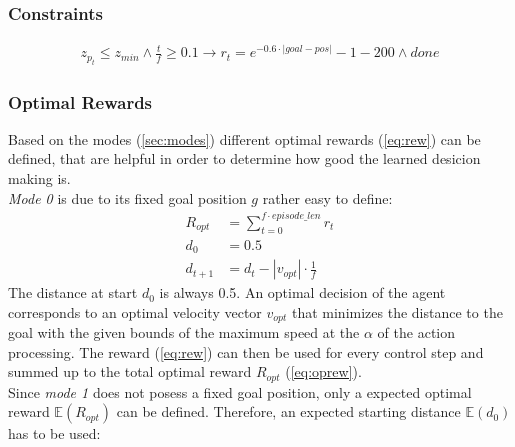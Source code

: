 \subsubsection{Constraints}
\begin{align}
	z_{p_t} \leq z_{min} \land \frac{t}{f} \geq 0.1 \to r_t = e^{-0.6 \cdot |goal - pos|} - 1 -200 \land done
\end{align}

\newpage

\subsubsection{Optimal Rewards}
Based on the modes (\cref{sec:modes}) different optimal rewards (\cref{eq:rew}) can be defined, that are helpful in order to determine how good the learned desicion making is.\\
\newline
\emph{Mode 0} is due to its fixed goal position $g$ rather easy to define:
\begin{align}
R_{opt} &= \sum_{t=0}^{f \cdot episode\_len} r_t \label{eq:oprew}\\
d_0 &= 0.5\\
d_{t+1} &= d_t - |v_{opt}| \cdot \frac{1}{f} \label{eq:dt1}%
\end{align}
The distance at start $d_0$ is always 0.5. An optimal decision of the agent corresponds to an optimal velocity vector $v_{opt}$ that minimizes the distance to the goal with the given bounds of the maximum speed at the $\alpha$ of the action processing. The reward (\cref{eq:rew}) can then be used for every control step and summed up to the total optimal reward $R_{opt}$ (\cref{eq:oprew}).\\
\newline
Since \emph{mode 1} does not posess a fixed goal position, only a expected optimal reward $\mathbb{E}(R_{opt})$ can be defined. Therefore, an expected starting distance $\mathbb{E}(d_0)$ has to be used:

